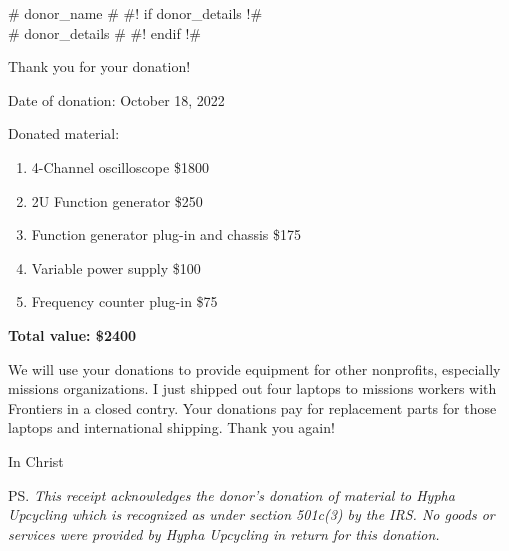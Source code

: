 \documentclass{letter}
\begin{document}
\begin{letter}{# donor_name # #! if donor_details !#\\# donor_details # #! endif !#}

	\opening{Thank you for your donation!}	
	Date of donation: October 18, 2022
	
	Donated material:
	\begin{enumerate}
		\item 4-Channel oscilloscope \$1800
		\item 2U Function generator \$250
		\item Function generator plug-in and chassis \$175
		\item Variable power supply \$100
		\item Frequency counter plug-in \$75

	\end{enumerate}

	\textbf{Total value: \$2400}
	
	We will use your donations to provide equipment for other nonprofits, especially missions organizations.
	I just shipped out four laptops to missions workers with Frontiers in a closed contry.
	Your donations pay for replacement parts for those laptops and international shipping.
	Thank you again!
	
	\closing{In Christ}

	\vspace*{\fill}
	\ps
	\textsl{This receipt acknowledges the donor's donation of material to Hypha Upcycling
	which is recognized as under section 501c(3) by the IRS.
	No goods or services were provided by Hypha Upcycling in return for this donation.
	}

\end{letter}
\end{document}
